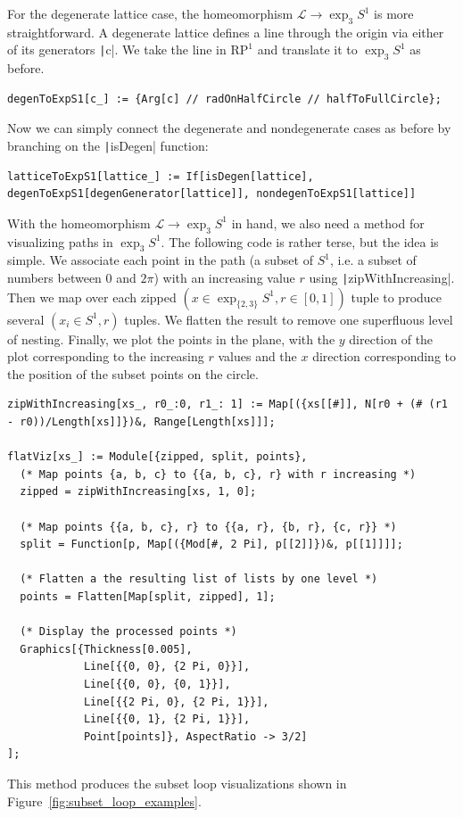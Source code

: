 \documentclass[12pt,twoside]{reedthesis}
\theoremstyle{definition}
\newcommand{\LS}{\mathcal{L}}
\newcommand{\exptwothree}{\exp_{\{2,3\}}}
\newcommand{\mathe}[1]{\texttt|#1|}
\begin{document}
For the degenerate lattice case, the homeomorphism $\LS \to \exp_3 S^1$ is more straightforward.
A degenerate lattice defines a line through the origin via either of its generators \texttt|c|.
We take the line in $\mathrm{RP}^1$ and translate it to $\exp_3 S^1$ as before.
\begin{verbatim}
degenToExpS1[c_] := {Arg[c] // radOnHalfCircle // halfToFullCircle};
\end{verbatim}
Now we can simply connect the degenerate and nondegenerate cases as before by branching on the \texttt|isDegen| function:
\begin{verbatim}
latticeToExpS1[lattice_] := If[isDegen[lattice], degenToExpS1[degenGenerator[lattice]], nondegenToExpS1[lattice]]
\end{verbatim}
With the homeomorphism $\LS \to \exp_3 S^1$ in hand, we also need a method for visualizing paths in $\exp_3 S^1$.
The following code is rather terse, but the idea is simple.
We associate each point in the path (a subset of $S^1$, i.e. a subset of numbers between 0 and $2\pi$) with an increasing value $r$ using \mathe{zipWithIncreasing}.
Then we map over each zipped $(x \in \exptwothree S^1, r \in [0,1])$ tuple to produce several $(x_i \in S^1, r)$ tuples.
We flatten the result to remove one superfluous level of nesting.
Finally, we plot the points in the plane, with the $y$ direction of the plot corresponding to the increasing $r$ values and the $x$ direction corresponding to the position of the subset points on the circle.
\begin{verbatim}
zipWithIncreasing[xs_, r0_:0, r1_: 1] := Map[({xs[[#]], N[r0 + (# (r1 - r0))/Length[xs]]})&, Range[Length[xs]]];

flatViz[xs_] := Module[{zipped, split, points},
  (* Map points {a, b, c} to {{a, b, c}, r} with r increasing *)
  zipped = zipWithIncreasing[xs, 1, 0];

  (* Map points {{a, b, c}, r} to {{a, r}, {b, r}, {c, r}} *)
  split = Function[p, Map[({Mod[#, 2 Pi], p[[2]]})&, p[[1]]]];

  (* Flatten a the resulting list of lists by one level *)
  points = Flatten[Map[split, zipped], 1];

  (* Display the processed points *)
  Graphics[{Thickness[0.005],
            Line[{{0, 0}, {2 Pi, 0}}],
            Line[{{0, 0}, {0, 1}}],
            Line[{{2 Pi, 0}, {2 Pi, 1}}],
            Line[{{0, 1}, {2 Pi, 1}}],
            Point[points]}, AspectRatio -> 3/2]
];
\end{verbatim}
This method produces the subset loop visualizations shown in Figure~\ref{fig:subset_loop_examples}.

\newpage
\printbibliography
\end{document}
